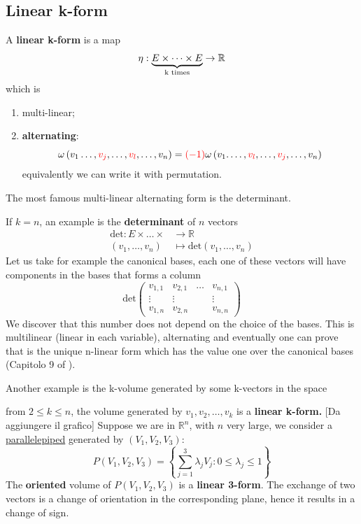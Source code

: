 \documentclass[../main.tex]{subfiles}
\begin{document}
\subsection{Linear k-form}
\begin{definition}
A \textbf{linear k-form} is a map
\[
\eta : \underbrace{E\times\dots\times E}_{\textrm{k times}} \to  \mathbb{R}\\
\]
which is
\begin{enumerate}
    \item multi-linear;
    \item \textbf{alternating}:
    \[
    \omega\left(v_1\dots,{\color{red}v_j},\dots,{\color{red}v_l},\dots,v_n\right)={\color{red}(-1)}\omega\left(v_1.\dots,{\color{red}v_l},\dots,{\color{red}v_j},\dots,v_n\right)
    \]
    equivalently we can write it with permutation.
\end{enumerate}
\end{definition}
The most famous multi-linear alternating form is the determinant.
\begin{example}
If $k=n$, an example is the \textbf{determinant} of $n$ vectors
\[
\begin{split}
\textrm{det} : E\times\dots\times & \to  \mathbb{R}\\
(v_1,\dots,v_n) &\mapsto \textrm{det}(v_1,\dots,v_n)
\end{split}
\]
Let us take for example the canonical bases, each one of these vectors will have components in the bases that forms a column
\[
\textrm{det}
\begin{pmatrix}
v_{1,1} & v_{2,1} & \dots & v_{n,1}\\
\vdots & \vdots & & \vdots\\
v_{1,n} & v_{2,n} & & v_{n,n}
\end{pmatrix}
\]
We discover that this number does not depend on the choice of the bases. This is multilinear (linear in each variable), alternating and eventually one can prove that is the unique n-linear form which has the value one over the canonical bases (Capitolo 9 of ).
\end{example}
Another example is the k-volume generated by some k-vectors in the space
\begin{example}
from $2\leq k \leq n$, the volume generated by $v_1, v_2,\dots, v_k$  is a \textbf{linear k-form.}
[Da aggiungere il grafico] Suppose we are in $\mathbb{R}^n$, with $n$ very large, we consider a \href{https://it.wikipedia.org/wiki/Parallelepipedo}{parallelepiped} generated by $(V_1,V_2,V_3)$:
\[
P(V_1,V_2,V_3)=\left\{\sum_{j=1}^3 \lambda_j V_j : 0 \le \lambda_j \le 1\right\}
\]
The \textbf{oriented} volume of $P(V_1,V_2,V_3)$ is a \textbf{linear 3-form}. The exchange of two vectors is a change of orientation in the corresponding plane, hence it results in a change of sign.
\end{example}
\end{document}
